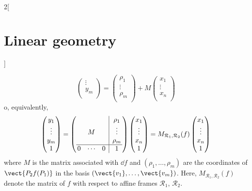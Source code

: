 \documentclass[../../../main.tex]{subfiles}
\begin{document}
\begin{multicols}{2}[\section{Linear geometry}]
\begin{prop}
$$\begin{pmatrix}
\vdots \\
y_m \\
\end{pmatrix}=\begin{pmatrix}
\rho_1 \\
\vdots \\
\rho_m \\
\end{pmatrix}+M\begin{pmatrix}
x_1 \\
\vdots \\
x_n \\
\end{pmatrix}$$
o, equivalently,
$$\begin{pmatrix}
y_1 \\
\vdots \\
y_m \\
1 \\
\end{pmatrix}=\left(\begin{array}{@{\,}ccc|c@{\,}}
    & & &\rho_1\\
    & M & & \vdots\\
    & & & \rho_m\\
    \hline
    0 & \cdots & 0 &  1
\end{array}\right)\begin{pmatrix}
x_1 \\
\vdots \\
x_n \\
1 \\
\end{pmatrix}=M_{\mathcal{R}_1,\mathcal{R}_2}(f)\begin{pmatrix}
x_1 \\
\vdots \\
x_n \\
1 \\
\end{pmatrix}$$ where $M$ is the matrix associated with $\dd f$ and $(\rho_1,\ldots,\rho_m)$ are the coordinates of $\vect{P_2f(P_1)}$ in the basis $(\vect{v_1},\ldots,\vect{v_m})$. Here, $M_{\mathcal{R}_1,\mathcal{R}_2}(f)$ denote the matrix of $f$ with respect to affine frames $\mathcal{R}_1$, $\mathcal{R}_2$.
\end{prop}

\end{multicols}
\end{document}
